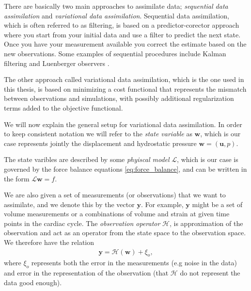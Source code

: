 There are basically two main approaches to assimilate data;
\emph{sequential data assimilation} and \emph{variational data
  assimilation}. Sequential data assimilation, which is often
referred to as filtering, is based on a predictor-corector approach
where you start from your initial data and use a filter to predict the
next state. Once you have your measurement available you correct the
estimate based on the new observations. Some examples of sequential
procedures include Kalman filtering and Luenberger observers
\cite{chapelle2013fundamental}.

The other approach called variational data assimilation, which is the
one used in this thesis, is based on minimizing a cost functional that
represents the mismatch between observations and simulations, with
possibly additional regularization terms added to the objective
functional. 

We will now explain the general setup for variational data
assimilation. In order to keep consistent notation we will refer to
the \emph{state variable} as $\mathbf{w}$, which is our case
represents jointly the displacement and hydrostatic pressure
$\mathbf{w}=(\mathbf{u}, p)$.

The state varibles are described by some \emph{phyiscal
model} $\mathcal{L}$, which is our case is governed by the force balance
equations \eqref{eq:force_balance}, and can be written in the form
$\mathcal{L}\mathbf{w} = f$.

We are also given a set of measurements (or observations) that we want
to assimilate, and we denote this by the vector $\mathbf{y}$.
For example, $\mathbf{y}$ might be a set of volume measurements or a
combinations of volume and strain at given time points in the cardiac
cycle. The \emph{observation operator} $\mathcal{H}$, is approximation
of the observation and act as an operator from the state space to the
observation space. We therefore have the relation
\begin{align}
  \mathbf{y} = \mathcal{H}(\mathbf{w}) + \xi_o, 
\end{align}
where $\xi_o$ represents both the error in the measurements (e.g
noise in the data) and error in the representation of the observation
(that $\mathcal{H}$ do not represent the data good enough).


